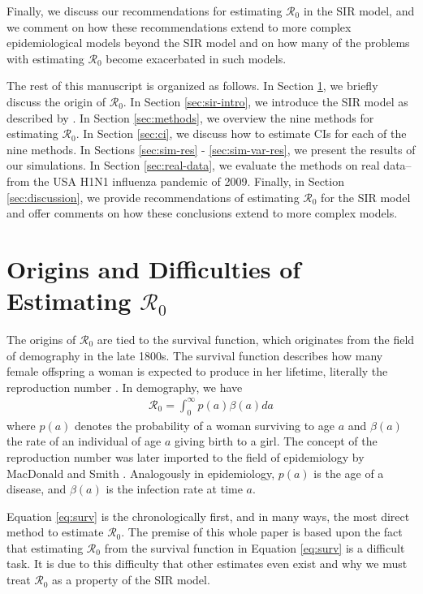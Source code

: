 \documentclass[12pt]{article}
\newcommand{\wxxsir}{nine } %
\newcommand{\rr}{\ensuremath{\mathcal{R}_0}}
\begin{document}
Finally, we discuss our recommendations for estimating $\rr$ in the SIR model, and we comment on how these recommendations extend to more complex epidemiological models beyond the SIR model and on how many of the problems with estimating $\rr$  become exacerbated in such models.


The rest of this manuscript is organized as follows.  In Section \ref{sec:r0}, we briefly discuss the origin of $\rr$.  In Section \ref{sec:sir-intro}, we introduce the SIR model as described by \cite{Kermack700}.  In Section \ref{sec:methods}, we overview the \wxxsir methods for estimating $\rr$. In Section \ref{sec:ci}, we discuss how to estimate CIs for each of the \wxxsir methods.  In Sections \ref{sec:sim-res} - \ref{sec:sim-var-res}, we present the results of our simulations.  In Section \ref{sec:real-data}, we evaluate the methods on real data--from the USA H1N1 influenza pandemic of 2009.  Finally, in Section \ref{sec:discussion}, we provide recommendations of estimating $\rr$ for the SIR model and offer comments on how these conclusions extend to more complex models.


\section{Origins and Difficulties of Estimating $\rr$}
\label{sec:r0}

The origins of $\rr$ are tied to the survival function, which originates from the field of demography in the late 1800s.  The survival function describes how many female offspring a woman is expected to produce in her lifetime, literally the reproduction number \citep{dietz1993estimation}.  In demography, we have
\begin{align}\label{eq:surv}
\rr = \int_0^\infty p(a) \beta(a) da
\end{align}
where $p(a)$ denotes the probability of a woman surviving to age $a$ and $\beta(a)$ the rate of an individual of age $a$ giving birth to a  girl.  The concept of the reproduction number was later imported to the field of epidemiology by MacDonald and Smith \citep{dietz1993estimation}.  Analogously in epidemiology, $p(a)$ is the age of a disease, and $\beta(a)$ is the infection rate at time $a$.

Equation \ref{eq:surv} is the chronologically first, and in many ways, the most direct method to estimate $\rr$.  The premise of this whole paper is based upon the fact that estimating $\rr$ from the survival function in Equation \eqref{eq:surv} is a difficult task.  It is due to this difficulty that other estimates even exist and why we must treat $\rr$ as a property of the SIR model.
\end{document}
